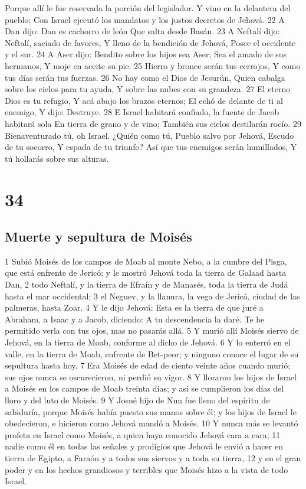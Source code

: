 Porque allí le fue reservada la porción del legislador.
Y vino en la delantera del pueblo;
Con Israel ejecutó los mandatos y los justos decretos de Jehová.
22 A Dan dijo:
Dan es cachorro de león
Que salta desde Basán.
23 A Neftalí dijo:
Neftalí, saciado de favores,
Y lleno de la bendición de Jehová,
Posee el occidente y el sur.
24 A Aser dijo:
Bendito sobre los hijos sea Aser;
Sea el amado de sus hermanos,
Y moje en aceite su pie.
25 Hierro y bronce serán tus cerrojos,
Y como tus días serán tus fuerzas.
26 No hay como el Dios de Jesurún,
Quien cabalga sobre los cielos para tu ayuda,
Y sobre las nubes con su grandeza.
27 El eterno Dios es tu refugio,
Y acá abajo los brazos eternos;
El echó de delante de ti al enemigo, 
Y dijo: Destruye.
28 E Israel habitará confiado, la fuente de Jacob habitará sola
En tierra de grano y de vino;
También sus cielos destilarán rocío.
29 Bienaventurado tú, oh Israel.
¿Quién como tú,
Pueblo salvo por Jehová,
Escudo de tu socorro,
Y espada de tu triunfo?
Así que tus enemigos serán humillados,
Y tú hollarás sobre sus alturas.

\chapter{34}


\section{Muerte y sepultura de Moisés}


1 Subió Moisés de los campos de Moab al monte Nebo, a la cumbre del Pisga, que está enfrente de Jericó; y le mostró Jehová toda la tierra de Galaad hasta Dan,
2 todo Neftalí, y la tierra de Efraín y de Manasés, toda la tierra de Judá hasta el mar occidental;
3 el Neguev, y la llanura, la vega de Jericó, ciudad de las palmeras, hasta Zoar.
4 Y le dijo Jehová: Esta es la tierra de que juré a Abraham, a Isaac y a Jacob, diciendo: A tu descendencia la daré. Te he permitido verla con tus ojos, mas no pasarás allá.
5 Y murió allí Moisés siervo de Jehová, en la tierra de Moab, conforme al dicho de Jehová.
6 Y lo enterró en el valle, en la tierra de Moab, enfrente de Bet-peor; y ninguno conoce el lugar de su sepultura hasta hoy.
7 Era Moisés de edad de ciento veinte años cuando murió; sus ojos nunca se oscurecieron, ni perdió su vigor.
8 Y lloraron los hijos de Israel a Moisés en los campos de Moab treinta días; y así se cumplieron los días del lloro y del luto de Moisés.
9 Y Josué hijo de Nun fue lleno del espíritu de sabiduría, porque Moisés había puesto sus manos sobre él; y los hijos de Israel le obedecieron, e hicieron como Jehová mandó a Moisés.
10 Y nunca más se levantó profeta en Israel como Moisés, a quien haya conocido Jehová cara a cara; 
11 nadie como él en todas las señales y prodigios que Jehová le envió a hacer en tierra de Egipto, a Faraón y a todos sus siervos y a toda su tierra,
12 y en el gran poder y en los hechos grandiosos y terribles que Moisés hizo a la vista de todo Israel.


